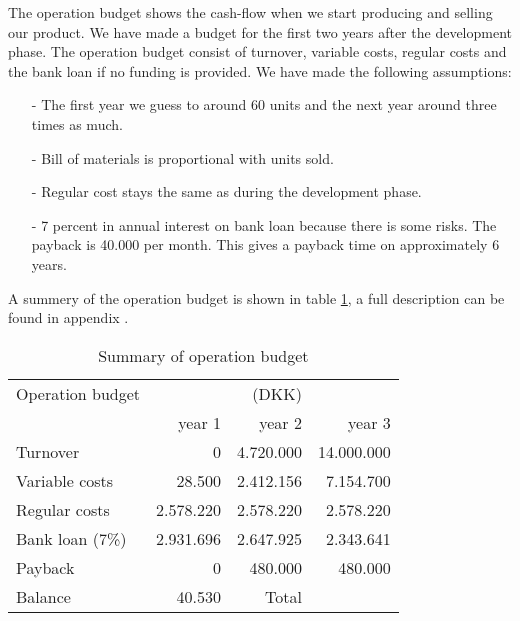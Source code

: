 The operation budget shows the cash-flow when we start producing and selling our product. We have made a budget for the first two years after the development phase. The operation budget consist of turnover, variable costs, regular costs and the bank loan if no funding is provided. We have made the following assumptions:
\begin{itemize}
\item[-] The first year we guess to around 60 units and the next year around three times as much.
\item[-] Bill of materials is proportional with units sold.
\item[-] Regular cost stays the same as during the development phase.
\item[-] 7 percent in annual interest on bank loan because there is some risks. The payback is 40.000 per month. This gives a payback time on approximately 6 years.
\end{itemize}
A summery of the operation budget is shown in table \ref{opebud}, a full description can be found in appendix .
\begin{table}[h!]
\label{opebud}
\centering
\begin{tabular}{l r r r}
Operation budget						& 				&\hfill(DKK)\\
						&	year 1		& year 2		& year 3 \\
\hline
Turnover				&			0	& 4.720.000		& 14.000.000 \\
Variable costs	  		&		28.500	& 2.412.156		& 7.154.700 \\
Regular costs			&	2.578.220  	& 2.578.220 	& 2.578.220	 \\
Bank loan (7\%)			& 2.931.696 	& 2.647.925 	& 2.343.641\\
Payback					&			0	&	480.000		& 480.000\\
Balance					&		40.530	&
\hline
Total         							&   			&\\
\end{tabular}
\caption{Summary of operation budget}
\end{table}
